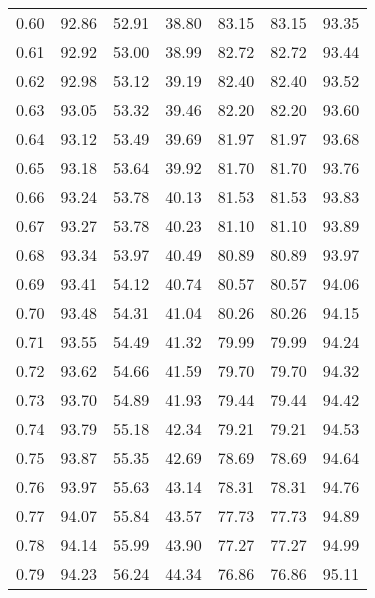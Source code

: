 \begin{tabular}{|c|c|c|c|c|c|c|}
      0.60 &     92.86 &     52.91 &      38.80 &   83.15 &      83.15 &         93.35 \\
      0.61 &     92.92 &     53.00 &      38.99 &   82.72 &      82.72 &         93.44 \\
      0.62 &     92.98 &     53.12 &      39.19 &   82.40 &      82.40 &         93.52 \\
      0.63 &     93.05 &     53.32 &      39.46 &   82.20 &      82.20 &         93.60 \\
      0.64 &     93.12 &     53.49 &      39.69 &   81.97 &      81.97 &         93.68 \\
      0.65 &     93.18 &     53.64 &      39.92 &   81.70 &      81.70 &         93.76 \\
      0.66 &     93.24 &     53.78 &      40.13 &   81.53 &      81.53 &         93.83 \\
      0.67 &     93.27 &     53.78 &      40.23 &   81.10 &      81.10 &         93.89 \\
      0.68 &     93.34 &     53.97 &      40.49 &   80.89 &      80.89 &         93.97 \\
      0.69 &     93.41 &     54.12 &      40.74 &   80.57 &      80.57 &         94.06 \\
      0.70 &     93.48 &     54.31 &      41.04 &   80.26 &      80.26 &         94.15 \\
      0.71 &     93.55 &     54.49 &      41.32 &   79.99 &      79.99 &         94.24 \\
      0.72 &     93.62 &     54.66 &      41.59 &   79.70 &      79.70 &         94.32 \\
      0.73 &     93.70 &     54.89 &      41.93 &   79.44 &      79.44 &         94.42 \\
      0.74 &     93.79 &     55.18 &      42.34 &   79.21 &      79.21 &         94.53 \\
      0.75 &     93.87 &     55.35 &      42.69 &   78.69 &      78.69 &         94.64 \\
      0.76 &     93.97 &     55.63 &      43.14 &   78.31 &      78.31 &         94.76 \\
      0.77 &     94.07 &     55.84 &      43.57 &   77.73 &      77.73 &         94.89 \\
      0.78 &     94.14 &     55.99 &      43.90 &   77.27 &      77.27 &         94.99 \\
      0.79 &     94.23 &     56.24 &      44.34 &   76.86 &      76.86 &         95.11 \\

\end{tabular}
